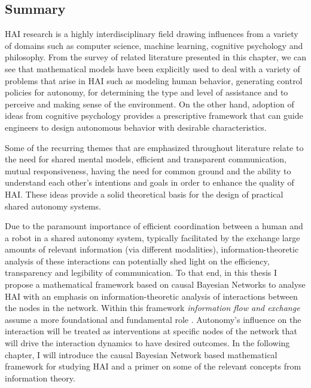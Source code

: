\documentclass[12pt]{article}
\begin{document}
\subsection{Summary}

HAI research is a highly interdisciplinary field drawing influences from a variety of domains such as computer science, machine learning, cognitive psychology and philosophy. From the survey of related literature presented in this chapter, we can see that mathematical models have been explicitly used to deal with a variety of problems that arise in HAI such as modeling human behavior, generating control policies for autonomy, for determining the type and level of assistance and to perceive and making sense of the environment. On the other hand, adoption of ideas from cognitive psychology provides a prescriptive framework that can guide engineers to design autonomous behavior with desirable characteristics. 

Some of the recurring themes that are emphasized throughout literature relate to the need for shared mental models, efficient and transparent communication, mutual responsiveness, having the need for common ground and the ability to understand each other's intentions and goals in order to enhance the quality of HAI. These ideas provide a solid theoretical basis for the design of practical shared autonomy systems. 

Due to the paramount importance of efficient coordination between a human and a robot in a shared autonomy system, typically facilitated by the exchange large amounts of relevant information (via different modalities), information-theoretic analysis of these interactions can potentially shed light on the efficiency, transparency and legibility of communication. To that end, in this thesis I propose a mathematical framework based on causal Bayesian Networks to analyse HAI 
with an emphasis on information-theoretic analysis of interactions between the nodes in the network. Within this framework \textit{information flow and exchange} assume a more foundational and fundamental role . Autonomy's influence on the interaction will be treated as interventions at specific nodes of the network that will drive the interaction dynamics to have desired outcomes. In the following chapter, I will introduce the causal Bayesian Network based mathematical framework for studying HAI and a primer on some of the relevant concepts from information theory. 
\end{document}
